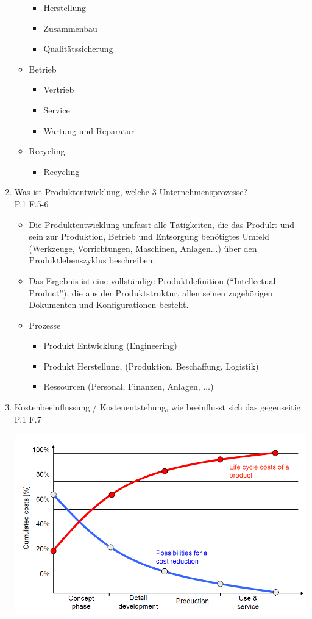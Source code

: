 \documentclass[10pt,a4paper,fleqn]{article}
\begin{document}
\begin{enumerate}
\begin{itemize}
\begin{itemize}
					\item Herstellung
					\item Zusammenbau
					\item Qualitätssicherung
				\end{itemize}
			\item Betrieb
				\begin{itemize}
					\item Vertrieb
					\item Service
					\item Wartung und Reparatur
				\end{itemize}
			\item Recycling
				\begin{itemize}
					\item Recycling
				\end{itemize}
		\end{itemize}
\item Was ist Produktentwicklung, welche 3 Unternehmensprozesse?\\
	P.1 F.5-6
	\begin{itemize}
		\item Die Produktentwicklung umfasst alle Tätigkeiten, die das Produkt und sein zur Produktion, Betrieb und Entsorgung benötigtes Umfeld (Werkzeuge, Vorrichtungen, Maschinen, Anlagen...) über den Produktlebenszyklus beschreiben.
		\item Das Ergebnis ist eine vollständige Produktdefinition (“Intellectual Product”), die aus der Produktstruktur, allen seinen zugehörigen Dokumenten und Konfigurationen besteht.
		\item Prozesse
			\begin{itemize}
				\item Produkt Entwicklung (Engineering)
				\item Produkt Herstellung, (Produktion, Beschaffung, Logistik)
				\item Ressourcen (Personal, Finanzen, Anlagen, $\dots$)
			\end{itemize}
	\end{itemize}
\pagebreak
\item Kostenbeeinflussung / Kostenentstehung, wie beeinflusst sich das gegenseitig.\\
	P.1 F.7\\
	\begin{center}
		\includegraphics[scale=0.4]{kosten.png}

\end{center}
\end{enumerate}
\end{document}
